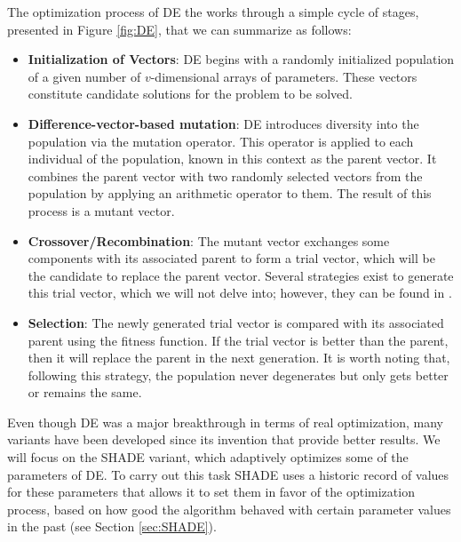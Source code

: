 The optimization process of \acs{DE} the works through a simple cycle of stages, presented in Figure \ref{fig:DE}, that we can summarize as follows:

\begin{itemize}
	
	\item \textbf{Initialization of Vectors}: \acs{DE} begins with a randomly initialized population of a given number of $v$-dimensional arrays of parameters. These vectors constitute candidate solutions for the problem to be solved.
	
	\item \textbf{Difference-vector-based mutation}: \acs{DE} introduces diversity into the population via the mutation operator. This operator is applied to each individual of the population, known in this context as the parent vector. It combines the parent vector with two randomly selected vectors from the population by applying an arithmetic operator to them. The result of this process is a mutant vector.
	
	\item \textbf{Crossover/Recombination}: The mutant vector exchanges some components with its associated parent to form a trial vector, which will be the candidate to replace the parent vector. Several strategies exist to generate this trial vector, which we will not delve into; however, they can be found in \cite{das2011differential}.
	
	\item \textbf{Selection}: The newly generated trial vector is compared with its associated parent using the fitness function. If the trial vector is better than the parent, then it will replace the parent in the next generation. It is worth noting that, following this strategy, the population never degenerates but only gets better or remains the same.
	
\end{itemize}

Even though \acs{DE} was a major breakthrough in terms of real optimization, many variants have been developed since its invention that provide better results. We will focus on the \acs{SHADE} variant, which adaptively optimizes some of the parameters of \acs{DE}. To carry out this task \acs{SHADE} uses a historic record of values for these parameters that allows it to set them in favor of the optimization process, based on how good the algorithm behaved with certain parameter values in the past (see Section \ref{sec:SHADE}).

